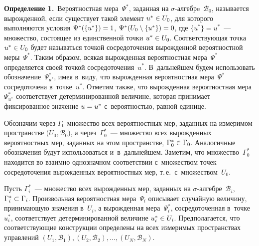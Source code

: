 \begin{multicols}{2}
\noindent
\textbf{Определение 1.}\ Вероятностная мера~$\Psi^*$, заданная 
на $\sigma$-ал\-геб\-рe~$\mathscr{B}_0$, называется вырожденной, если существует 
такой элемент $u^* \hm\in U_0$, для которого выполняются условия $\Psi^*(\{u^*\})\hm=
1$, $\Psi^*(U_0 \setminus \{u^*\})\hm=0$, где $\{u^*\}=u^*$~--- 
множество, состоящее из единственной точки $u^* \hm\in U_0$. Соответствующая 
точка $u^* \hm\in U_0$ будет называться точкой сосредоточения вырожденной 
вероятностной меры~$\Psi^*$.
Таким образом, всякая вырожденная вероятностная мера~$\Psi^*$ определяется 
своей точкой сосредоточения~$u^*$. В~дальнейшем будем использовать 
обозначение~$\Psi_{u^*}^{*}$, имея в~виду, что вырожденная вероятностная мера~$\Psi^*$ 
сосредоточена в~точке~$u^*$.
Отметим также, что вырожденная вероятностная мера~$\Psi_{u^*}^{*}$ соответствует 
детерминированной величине, которая принимает фиксированное значение $u\hm=u^*$ 
с~вероятностью, равной единице.

\medskip

Обозначим через $\Gamma_0$ множество всех  вероятностных мер, заданных 
на измеримом пространстве ($U_0, \mathscr{B}_0$), а через~$\Gamma_0^*$~--- 
множество всех вырожденных вероятностных мер, заданных на этом пространстве, 
$\Gamma_0^*\hm\in \Gamma_0$. Аналогичные обозначения будут использоваться 
и~в~дальнейшем. Заметим, что множество~$\Gamma_0^*$ находится во взаимно
 однозначном соответствии с~множеством точек сосредоточения вырожденных 
 вероятностных мер, т.\,е.\ с~множеством~$U_0$.

Пусть $\Gamma_i^{*}$~--- множество всех вырожденных мер, заданных на 
$\sigma$-ал\-геб\-ре~$\mathscr{B}_i$, $\Gamma_i^{*}\hm\subset \Gamma_i$.
Произвольная вероятностная мера~$\Psi_i$ описывает случайную величину, 
принимающую значения в~$U_i$, а вырожденная мера~$\Psi_i^*$, сосредоточенная 
в~точке~$u_i^*$, соответствует детерминированной величине $u_i^*\hm\in U_i$.
Предполагается, что соответствующие конструкции определены на всех измеримых 
пространствах управлений $(U_1, \mathscr{B}_1), (U_2, \mathscr{B}_2), \ldots, 
(U_N,\mathscr{B}_N)$.


\end{multicols}
